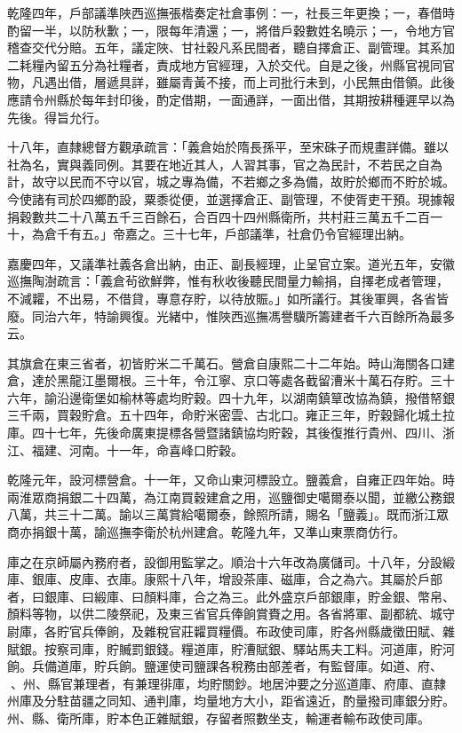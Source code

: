 \begin{pinyinscope}
乾隆四年，戶部議準陜西巡撫張楷奏定社倉事例：一，社長三年更換；一，春借時酌留一半，以防秋歉；一，限每年清還；一，將借戶穀數姓名曉示；一，令地方官稽查交代分賠。五年，議定陜、甘社穀凡系民間者，聽自擇倉正、副管理。其系加二耗糧內留五分為社糧者，責成地方官經理，入於交代。自是之後，州縣官視同官物，凡遇出借，層遞具詳，雖屬青黃不接，而上司批行未到，小民無由借領。此後應請令州縣於每年封印後，酌定借期，一面通詳，一面出借，其期按耕種遲早以為先後。得旨允行。

十八年，直隸總督方觀承疏言：「義倉始於隋長孫平，至宋硃子而規畫詳備。雖以社為名，實與義同例。其要在地近其人，人習其事，官之為民計，不若民之自為計，故守以民而不守以官，城之專為備，不若鄉之多為備，故貯於鄉而不貯於城。今使諸有司於四鄉酌設，粟黍從便，並選擇倉正、副管理，不使胥吏干預。現據報捐穀數共二十八萬五千三百餘石，合百四十四州縣衛所，共村莊三萬五千二百一十，為倉千有五。」帝嘉之。三十七年，戶部議準，社倉仍令官經理出納。

嘉慶四年，又議準社義各倉出納，由正、副長經理，止呈官立案。道光五年，安徽巡撫陶澍疏言：「義倉茍欲鮮弊，惟有秋收後聽民間量力輸捐，自擇老成者管理，不減糶，不出易，不借貸，專意存貯，以待放賑。」如所議行。其後軍興，各省皆廢。同治六年，特諭興復。光緒中，惟陜西巡撫馮譽驥所籌建者千六百餘所為最多云。

其旗倉在東三省者，初皆貯米二千萬石。營倉自康熙二十二年始。時山海關各口建倉，達於黑龍江墨爾根。三十年，令江寧、京口等處各截留漕米十萬石存貯。三十六年，諭沿邊衛堡如榆林等處均貯穀。四十九年，以湖南鎮筸改協為鎮，撥借帑銀三千兩，買穀貯倉。五十四年，命貯米密雲、古北口。雍正三年，貯穀歸化城土拉庫。四十七年，先後命廣東提標各營暨諸鎮協均貯穀，其後復推行貴州、四川、浙江、福建、河南。十一年，命喜峰口貯穀。

乾隆元年，設河標營倉。十一年，又命山東河標設立。鹽義倉，自雍正四年始。時兩淮眾商捐銀二十四萬，為江南買穀建倉之用，巡鹽御史噶爾泰以聞，並繳公務銀八萬，共三十二萬。諭以三萬賞給噶爾泰，餘照所請，賜名「鹽義」。既而浙江眾商亦捐銀十萬，諭巡撫李衛於杭州建倉。乾隆九年，又準山東票商仿行。

庫之在京師屬內務府者，設御用監掌之。順治十六年改為廣儲司。十八年，分設緞庫、銀庫、皮庫、衣庫。康熙十八年，增設茶庫、磁庫，合之為六。其屬於戶部者，曰銀庫、曰緞庫、曰顏料庫，合之為三。此外盛京戶部銀庫，貯金銀、幣帛、顏料等物，以供二陵祭祀，及東三省官兵俸餉賞賚之用。各省將軍、副都統、城守尉庫，各貯官兵俸餉，及雜稅官莊糶買糧價。布政使司庫，貯各州縣歲徵田賦、雜賦銀。按察司庫，貯贓罰銀錢。糧道庫，貯漕賦銀、驛站馬夫工料。河道庫，貯河餉。兵備道庫，貯兵餉。鹽運使司鹽課各稅務由部差者，有監督庫。如道、府、、州、縣官兼理者，有兼理徘庫，均貯關鈔。地居沖要之分巡道庫、府庫、直隸州庫及分駐苗疆之同知、通判庫，均量地方大小，距省遠近，酌量撥司庫銀分貯。州、縣、衛所庫，貯本色正雜賦銀，存留者照數坐支，輸運者輸布政使司庫。


\end{pinyinscope}
